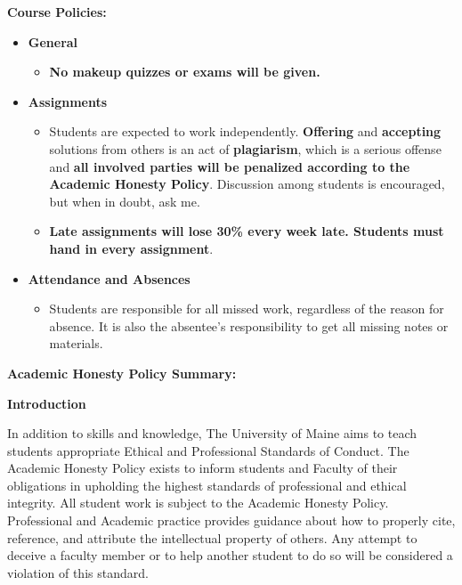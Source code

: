 \documentclass[11pt]{article}
\begin{document}
\textbf {\large Course Policies:}
\begin{itemize}
\item \textbf {General}
  \begin{itemize}
  \item \textbf {No makeup quizzes or exams will be given.}
  \end{itemize}
\item \textbf {Assignments}
  \begin{itemize}
  \item Students are expected to work independently. \textbf{Offering}
    and \textbf{accepting} solutions from others is an act of
    \textbf{plagiarism}, which is a serious offense and \textbf{all
      involved parties will be penalized according to the Academic
      Honesty Policy}. Discussion among students is encouraged, but
    when in doubt, ask me.
  \item \textbf{Late assignments will lose 30\% every week late.
    Students must hand in every assignment}.
  \end{itemize}
\item \textbf{Attendance and Absences}
  \begin{itemize}
  \item Students are responsible for all missed work, regardless of
    the reason for absence. It is also the absentee's responsibility
    to get all missing notes or materials.
  \end{itemize}
\end{itemize}

\textbf {\large Academic Honesty Policy Summary:} 

\textbf{Introduction}

\hspace{3mm} \hangindent=5mm In addition to skills and knowledge, The
University of Maine aims to teach students appropriate Ethical and
Professional Standards of Conduct. The Academic Honesty Policy exists
to inform students and Faculty of their obligations in upholding the
highest standards of professional and ethical integrity. All student
work is subject to the Academic Honesty Policy. Professional and
Academic practice provides guidance about how to properly cite,
reference, and attribute the intellectual property of others. Any
attempt to deceive a faculty member or to help another student to do
so will be considered a violation of this standard.
\end{document}
